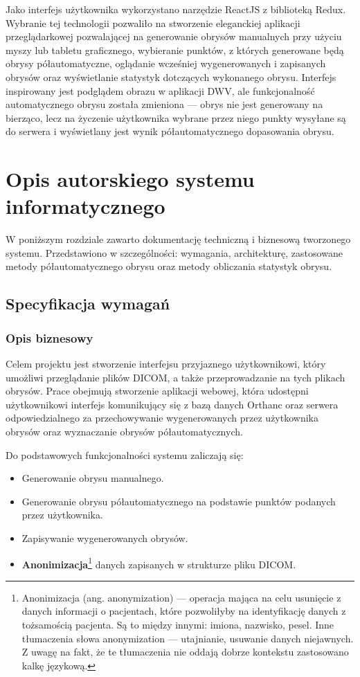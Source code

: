 \documentclass[a4paper,11pt,twoside]{report}
\theoremstyle{definition}
\begin{document}
Jako interfejs użytkownika wykorzystano narzędzie ReactJS z biblioteką Redux. Wybranie tej technologii pozwaliło na stworzenie eleganckiej aplikacji przeglądarkowej pozwalającej na generowanie obrysów manualnych przy użyciu myszy lub tabletu graficznego, wybieranie punktów, z których generowane będą obrysy półautomatyczne, oglądanie wcześniej wygenerowanych i zapisanych obrysów oraz wyświetlanie statystyk dotczących wykonanego obrysu. Interfejs inspirowany jest podglądem obrazu w aplikacji DWV, ale funkcjonalność automatycznego obrysu została zmieniona --- obrys nie jest generowany na bierząco, lecz na życzenie użytkownika wybrane przez niego punkty wysyłane są do serwera i wyświetlany jest wynik półautomatycznego dopasowania obrysu.

\chapter {Opis autorskiego systemu informatycznego}

W poniższym rozdziale zawarto dokumentację techniczną i biznesową tworzonego systemu. Przedstawiono w szczególności: wymagania, architekturę, zastosowane metody półautomatycznego obrysu oraz metody obliczania statystyk obrysu.

\section {Specyfikacja wymagań}

\subsection {Opis biznesowy}

Celem projektu jest stworzenie interfejsu przyjaznego użytkownikowi, który umożliwi przeglądanie plików DICOM, a także przeprowadzanie na tych plikach obrysów. Prace obejmują stworzenie aplikacji webowej, która udostępni użytkownikowi interfejs komunikujący się z bazą danych Orthanc oraz serwera odpowiedzialnego za przechowywanie wygenerowanych przez użytkownika obrysów oraz wyznaczanie obrysów półautomatycznych. 

Do podstawowych funkcjonalności systemu zaliczają się:
\begin{itemize}[noitemsep]
\item Generowanie obrysu manualnego.
\item Generowanie obrysu półautomatycznego na podstawie punktów podanych przez użytkownika.
\item Zapisywanie wygenerowanych obrysów.
\item \textbf {Anonimizacja}\footnote {Anonimizacja (ang. anonymization) --- operacja mająca na celu usunięcie z danych informacji o pacjentach, które pozwoliłyby na identyfikację danych z tożsamością pacjenta. Są to między innymi: imiona, nazwisko, pesel. Inne tłumaczenia słowa anonymization --- utajnianie, usuwanie danych niejawnych. Z uwagę na fakt, że te tłumaczenia nie oddają dobrze kontekstu zastosowano kalkę językową.} danych zapisanych w strukturze pliku DICOM.
\end{itemize}
\end{document}

